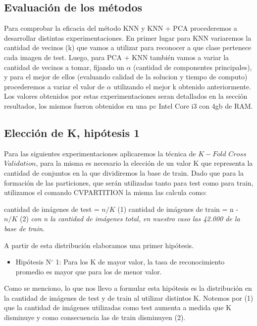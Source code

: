 \newpage

\subsection{Evaluación de los métodos}
Para comprobar la eficacia del método KNN y KNN + PCA procederemos a desarrollar distintas experimentaciones. En primer lugar para KNN variaremos la cantidad de vecinos (k) que vamos a utilizar para reconocer a que clase pertenece cada imagen de test. Luego, para PCA + KNN también vamos a variar la cantidad de vecinos a tomar, fijando un $\alpha$ (cantidad de componentes principales),  y para el mejor de ellos (evaluando calidad de la solucion y tiempo de computo) procederemos a variar el valor de $\alpha$ utilizando el mejor k obtenido  anteriormente. Los valores obtenidos por estas experimentaciones seran detallados en la sección resultados, los mismos fueron obtenidos en una pc Intel Core i3 con 4gb de RAM.\newline

\subsection{Elección de K, hipótesis 1}


 Para las siguientes experimentaciones aplicaremos la técnica de $K-Fold$ $Cross$ $Validation$, para la misma es necesario la elección de un valor K que representa la cantidad de conjuntos en la que dividiremos la base de train. Dado que para la formación de las particiones, que serán utilizadas tanto para test como para train, utilizamos el comando CVPARTITION la misma las calcula como:\newline
 
 cantidad de imágenes de test = $n/K$  (1)\newline
  cantidad de imágenes de train = n - $n/K$ (2)\newline
  \textit{con n la cantidad de imágenes total, en nuestro caso las 42.000 de la base de train.}
  
A partir de esta distribución elaboramos una primer hipótesis.
\begin{itemize}
\item Hipótesis N$ ^{\circ} $ 1: Para los K de mayor valor, la tasa de reconocimiento promedio es mayor que para los de menor valor.  
\end{itemize}

 Como se menciono, lo que nos llevo a formular esta hipótesis es la distribución en la cantidad de imágenes de test y de train al utilizar distintos K. Notemos por (1) que la cantidad de imágenes utilizadas como test aumenta a medida que K disminuye y como consecuencia las de train disminuyen (2). 
 
